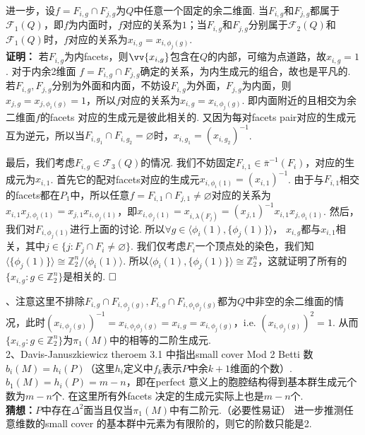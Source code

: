 \documentclass{article}
\theoremstyle{plain}%
\theoremstyle{definition}
\theoremstyle{remark}
\begin{document}
{{进一步，设$f=F_{i,g}\cap F_{j,g}$为$Q$中任意一个固定的余二维面. 当$F_{i,g}$和$F_{j,g}$都属于$\mathcal{F}_1(Q)$，即$f$为内面时，$f$对应的关系为$1$；当$F_{i,g}$和$F_{j,g}$分别属于$\mathcal{F}_2(Q)$和$\mathcal{F}_1(Q)$时，$f$对应的关系为$x_{i,g}=x_{i,\phi_j(g)}$.
}\\
{\bf 证明：}
若$F_{i,g}$为内facets，则$\vv{x_{i,g}}$包含在$Q$的内部，可缩为点道路，故$x_{i,g}=1$. 
对于内余2维面 $f=F_{i,g}\cap F_{j,g}$确定的关系，为内生成元的组合，故也是平凡的. 
若$F_{i,g},F_{j,g}$分别为外面和内面，不妨设$F_{i,g}$为外面，$F_{j,g}$为内面，则$x_{j,g}=x_{j,\phi_i(g)}=1$，所以$f$对应的关系为$x_{i,g}=x_{i,\phi_j(g)}$. 即内面附近的且相交为余二维面$f$的facets 对应的生成元是彼此相关的.
又因为每对facets pair对应的生成元互为逆元，所以当$F_{i,g_1}\cap F_{i,g_2}= \varnothing$时，$x_{i,g_1}= (x_{i,g_2})^{-1}$. 

最后，我们考虑$F_{i,g}\in \mathcal{F}_3(Q)$的情况. 我们不妨固定$F_{i,1}\in \bar{\pi}^{-1}(F_i)$，对应的生成元为$x_{i,1}$. 首先它的配对facets对应的生成元$x_{i,\phi_i(1)}=(x_{i,1})^{-1}$. 
由于与$F_{i,1}$相交的facets都在$P_{1}$中，所以任意$f=F_{i,1}\cap F_{j,1}\neq \varnothing$对应的关系为$x_{i,1}x_{j,\phi_i(1)}=x_{j,1}x_{i,\phi_j(1)}$，即$x_{i,\phi_j(1)}=x_{i,\lambda(F_j)}=(x_{j,1})^{-1}x_{i,1}x_{j,\phi_i(1)}$.
然后，我们对$F_{i,\phi_j(1)}$进行上面的讨论. 所以$\forall g \in \langle \phi_i(1),\{\phi_j(1)\}\rangle $， $x_{i,g}$都与$x_{i,1}$相关，其中$j\in \{j:F_j\cap F_i \neq \varnothing\}$. 我们仅考虑$F_i$一个顶点处的染色，我们知$\langle \{\phi_j(1)\}\rangle\cong \mathbb{Z}_2^{n}/\langle\phi_i(1)\rangle$. 所以$\langle \phi_i(1),\{\phi_j(1)\}\rangle \cong \mathbb{Z}_2^{n}$，这就证明了所有的$\{x_{i,g}:g\in \mathbb{Z}_2^{n}\}$是相关的.
$\hfill{} \Box$

{、注意这里不排除$F_{i,g}\cap F_{i,\phi_j(g)}, F_{i,g}\cap F_{i,\phi_i\phi_j(g)}$都为$Q$中非空的余二维面的情况，此时$(x_{i,\phi_j(g)})^{-1}=x_{i,\phi_i\phi_j(g)}=x_{i,g}=x_{i,\phi_j(g)}$，i.e. $(x_{i,\phi_j(g)})^{2}=1$. 从而$\{x_{i,g}:g\in\mathbb{Z}_2^n\}$为$\pi_1(M)$中的相等的二阶生成元. \\
2、Davis-Januszkiewicz \cite{DJ1} theroem 3.1 中指出small cover Mod 2 Betti 数$b_i(M)=h_i(P)$（这里$h_i$定义中$f_k$表示$P$中余$k+1$维面的个数）. $b_1(M)=h_i(P)=m-n$，即在perfect 意义上的胞腔结构得到基本群生成元个数为$m-n$个. 在这里所有外facets 决定的生成元实际上也是$m-n$个. \\
}
{\bf 猜想：}$P$中存在$\Delta^2$面当且仅当$\pi_1(M)$中有二阶元.（必要性易证）
进一步推测任意维数的small cover 的基本群中元素为有限阶的，则它的阶数只能是2.

}
\end{document}
